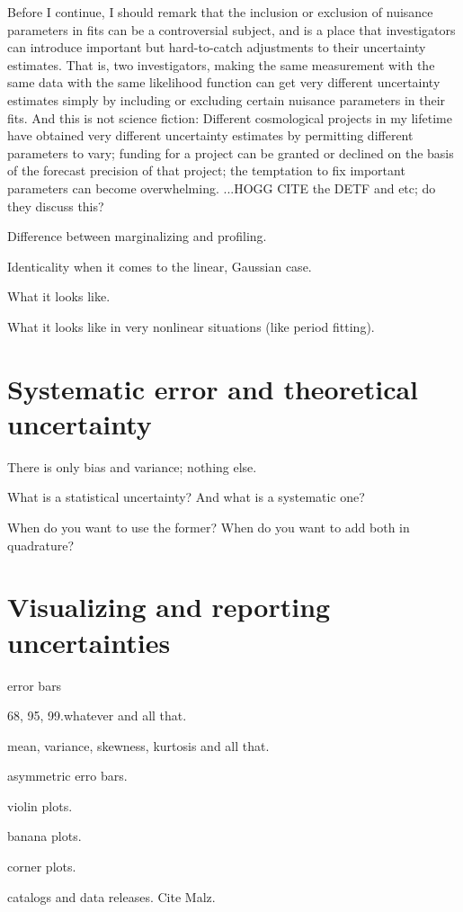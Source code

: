 \documentclass[10pt]{article}
\begin{document}
Before I continue, I should remark that the inclusion or exclusion of
nuisance parameters in fits can be a controversial subject, and is a
place that investigators can introduce important but hard-to-catch
adjustments to their uncertainty estimates.
That is, two investigators, making the same measurement with the same data
with the same likelihood function can get very different uncertainty estimates
simply by including or excluding certain nuisance parameters in their fits.
And this is not science fiction: Different cosmological projects in my lifetime
have obtained very different uncertainty estimates by permitting different
parameters to vary; funding for a project can be granted or declined on the basis
of the forecast precision of that project; the temptation to fix important parameters
can become overwhelming.
...HOGG CITE the DETF and etc; do they discuss this?

Difference between marginalizing and profiling.

Identicality when it comes to the linear, Gaussian case.

What it looks like.

What it looks like in very nonlinear situations (like period fitting).

\section{Systematic error and theoretical uncertainty}

There is only bias and variance; nothing else.

What is a statistical uncertainty? And what is a systematic one?

When do you want to use the former? When do you want to add both in quadrature?

\section{Visualizing and reporting uncertainties}

error bars

68, 95, 99.whatever and all that.

mean, variance, skewness, kurtosis and all that.

asymmetric erro bars.

violin plots.

banana plots.

corner plots.

catalogs and data releases. Cite Malz.
\end{document}
